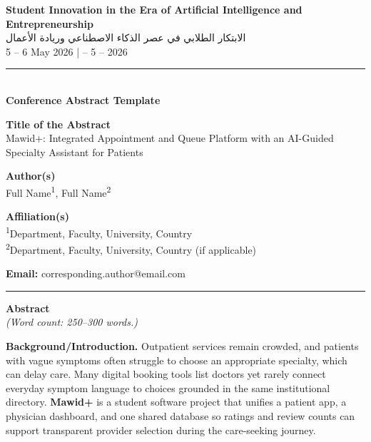 \documentclass[12pt,a4paper]{article}
\begin{document}
\thispagestyle{empty}

\begin{center}
{\large\bfseries Student Innovation in the Era of Artificial Intelligence and Entrepreneurship}\\[0.35em]
{\large الابتكار الطلابي في عصر الذكاء الاصطناعي وريادة الأعمال}\\[0.9em]
{\normalsize 5 -- 6 May 2026 \quad |  -- 5 -- 2026}\\[1.1em]
\rule{\textwidth}{0.4pt}\\[0.75em]
{\small\bfseries Conference Abstract Template}
\end{center}

\vspace{0.9em}

\noindent\textbf{Title of the Abstract}\\[0.25em]
Mawid+: Integrated Appointment and Queue Platform with an AI-Guided Specialty Assistant for Patients

\vspace{0.75em}

\noindent\textbf{Author(s)}\\[0.25em]
Full Name\textsuperscript{1}, Full Name\textsuperscript{2}

\vspace{0.75em}

\noindent\textbf{Affiliation(s)}\\[0.25em]
\textsuperscript{1}Department, Faculty, University, Country\\
\textsuperscript{2}Department, Faculty, University, Country \quad (if applicable)

\vspace{0.5em}
\noindent\textbf{Email:} corresponding.author@email.com

\vspace{1em}
\noindent\rule{\textwidth}{0.35pt}
\vspace{0.6em}

\noindent\textbf{Abstract}\\[0.35em]
\textit{(Word count: 250--300 words.)}

\vspace{0.45em}

\noindent\textbf{Background/Introduction.}
Outpatient services remain crowded, and patients with vague symptoms often struggle to choose an appropriate specialty, which can delay care. Many digital booking tools list doctors yet rarely connect everyday symptom language to choices grounded in the same institutional directory. \textbf{Mawid+} is a student software project that unifies a patient app, a physician dashboard, and one shared database so ratings and review counts can support transparent provider selection during the care-seeking journey.
\end{document}

